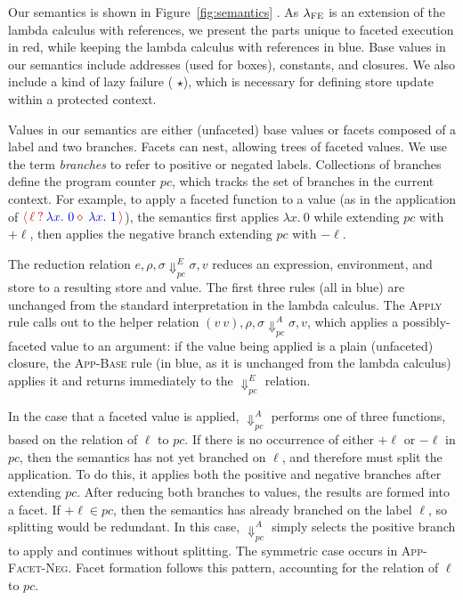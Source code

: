 \documentclass[review=true,acmlarge]{acmart}
\newcommand{\colorMATH}{black!20!blue}
\newcommand{\colorFAC}{black!20!red}
\newcommand{\blue}[1] {{\color{\colorMATH} #1}}
\newcommand{\fcol}[1] {{\color{\colorFAC} #1}}
\newcommand{\bmth}[1] {{\color{\colorMATH} $#1$}}
\newcommand{\rmth}[1] {{\color{\colorFAC} $#1$}}
\newcommand{\lang}[0]{$\lambda_\textsc{FE}$\xspace}
\newcommand{\facet}[3]{{\fcol{\ensuremath{\langle \, {#1} \: ? \: {#2} \diamond \: {#3} \, \rangle}}}}
\begin{document}
Our semantics is shown in Figure~\ref{fig:semantics} \cite{Micinski:2019}.
As \lang is an
extension of the lambda calculus with references, we present the parts
unique to faceted execution in \fcol{red}, while keeping the lambda
calculus with references in \blue{blue}. Base values in our semantics
include addresses (used for boxes), constants, and closures. We also
include a kind of lazy failure (\bmth{\star}), which is necessary for
defining store update within a protected context.

Values in our semantics are either (unfaceted) base values or facets
composed of a label and two branches. Facets can nest, allowing trees
of faceted values. We use the term \emph{branches} to refer to
positive or negated labels. Collections of branches define the program
counter \rmth{pc}, which tracks the set of branches in the current
context. For example, to apply a faceted function to a value (as in
the application of $\facet{\ell}{\blue{\lambda x.~0}}{\blue{\lambda x.~1}}$),
the semantics first applies \bmth{\lambda x.~0} while extending \rmth{pc}
with \rmth{+\ell}, then applies the negative branch extending
\rmth{pc} with \rmth{-\ell}.

The reduction relation \bmth{e, \rho, \sigma \Downarrow_{pc}^E \sigma,
  v} reduces an expression, environment, and store to a resulting
store and value. The first three rules (all in blue) are unchanged
from the standard interpretation in the lambda calculus. The
\textsc{Apply} rule calls out to the helper relation \rmth{(v~v),
  \rho, \sigma \Downarrow_{pc}^A \sigma, v}, which applies a
possibly-faceted value to an argument: if the value being applied is a
plain (unfaceted) closure, the \textsc{App-Base} rule (in blue, as it
is unchanged from the lambda calculus) applies it and returns
immediately to the \bmth{\Downarrow_{pc}^E} relation.

In the case that a faceted value is applied, \rmth{\Downarrow_{pc}^A}
performs one of three functions, based on the relation of \rmth{\ell}
to \rmth{pc}. If there is no occurrence of either \rmth{+\ell} or
\rmth{-\ell} in \rmth{pc}, then the semantics has not yet branched on
\rmth{\ell}, and therefore must split the application. To do this, it
applies both the positive and negative branches after extending
\rmth{pc}. After reducing both branches to values, the results are
formed into a facet. If \rmth{+\ell \in pc}, then the semantics has
already branched on the label \rmth{\ell}, so splitting would be
redundant. In this case, \rmth{\Downarrow_{pc}^A} simply selects the
positive branch to apply and continues without splitting. The
symmetric case occurs in \textsc{App-Facet-Neg}. Facet formation
follows this pattern, accounting for the relation of \rmth{\ell} to
\rmth{pc}.
\end{document}
